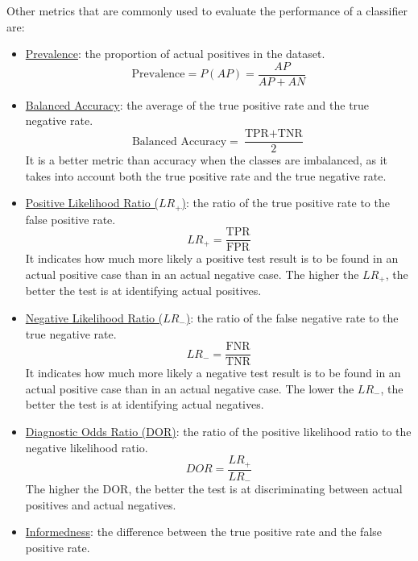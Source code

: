 Other metrics that are commonly used to evaluate the performance of a classifier are:
\begin{itemize}
    \item \ul{Prevalence}: the proportion of actual positives in the dataset.
    \begin{equation} \label{label:prevalence}
        \text{Prevalence} = P(AP) = \frac{AP}{AP + AN}
    \end{equation}
    \item \ul{Balanced Accuracy}: the average of the true positive rate and the true negative rate.
    \begin{equation} \label{label:balanced-accuracy}
        \text{Balanced Accuracy} = \frac{\text{TPR} + \text{TNR}}{2}
    \end{equation}
    It is a better metric than accuracy when the classes are imbalanced, as it takes into account both the true positive rate and the true negative rate.
    \item \ul{Positive Likelihood Ratio ($LR_+$)}: the ratio of the true positive rate to the false positive rate.
    \begin{equation} \label{label:lr+}
        LR_+ = \frac{\text{TPR}}{\text{FPR}}
    \end{equation}
    It indicates how much more likely a positive test result is to be found in an actual positive case than in an actual negative case. The higher the $LR_+$, the better the test is at identifying actual positives.
    \item \ul{Negative Likelihood Ratio ($LR_-$)}: the ratio of the false negative rate to the true negative rate.
    \begin{equation} \label{label:lr-}
        LR_- = \frac{\text{FNR}}{\text{TNR}}
    \end{equation}
    It indicates how much more likely a negative test result is to be found in an actual positive case than in an actual negative case. The lower the $LR_-$, the better the test is at identifying actual negatives.
    \item \ul{Diagnostic Odds Ratio (DOR)}: the ratio of the positive likelihood ratio to the negative likelihood ratio.
    \begin{equation} \label{label:dor}
        DOR = \frac{LR_+}{LR_-}
    \end{equation}
    The higher the DOR, the better the test is at discriminating between actual positives and actual negatives.
    \item \ul{Informedness}: the difference between the true positive rate and the false positive rate.

\end{itemize}
